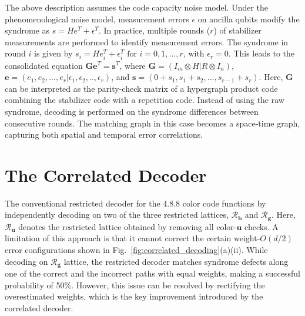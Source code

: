 \documentclass[%
 reprint,
 amsmath,amssymb,
 aps,
]{revtex4-2}
\begin{document}
The above description assumes the code capacity noise model. Under the phenomenological noise model, measurement errors $\epsilon$ on ancilla qubits modify the syndrome as $s = H e^T + \epsilon^T$. In practice, multiple rounds ($r$) of stabilizer measurements are performed to identify measurement errors.
The syndrome in round $i$ is given by $s_i=He_i^T+\epsilon_i^T \text{ for }i=0,1,...,r \text{, with }\epsilon_r=0$. This leads to the consolidated equation $\mathbf{G} \mathbf{e}^T = \mathbf{s}^T$, where $\textbf{G}=(I_m\otimes H|R \otimes I_n)$, $\textbf{e}=(e_1,e_2,...,e_r|\epsilon_1,\epsilon_2,..,\epsilon_{r})$, and $\textbf{s}=(0+s_1,s_1+s_2,...,s_{r-1}+s_r)$. Here, $\mathbf{G}$ can be interpreted as the parity-check matrix of a hypergraph product code combining the stabilizer code with a repetition code. Instead of using the raw syndrome, decoding is performed on the syndrome differences between consecutive rounds. The matching graph in this case becomes a space-time graph, capturing both spatial and temporal error correlations.



\section{\label{sec:correlated decoder}The Correlated Decoder} 

The conventional restricted decoder for the 4.8.8 color code functions by independently decoding on two of the three restricted lattices, $\mathcal{R}_\textbf{b}$ and $\mathcal{R}_\textbf{g}$. Here, $\mathcal{R}_\mathbf{u}$ denotes the restricted lattice obtained by removing all color-$\mathbf{u}$ checks.
A limitation of this approach is that it cannot correct the certain weight-$O(d/2)$ error configurations shown in Fig.~\ref{fig:correlated_decoding}(a)(ii). While decoding on $\mathcal{R}_\textbf{g}$ lattice, the restricted decoder matches syndrome defects along one of the correct and the incorrect paths with equal weights, making a successful probability of 50\%. However, this issue can be resolved by rectifying the overestimated weights, which is the key improvement introduced by the correlated decoder.
\end{document}
